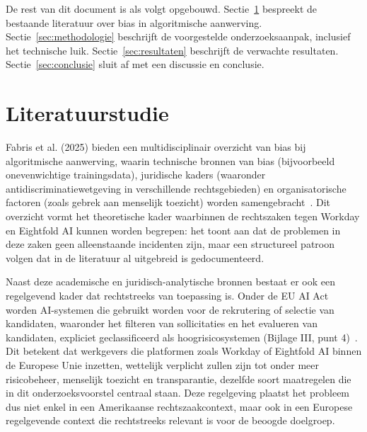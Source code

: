 \documentclass{hogent-article}
\begin{document}
De rest van dit document is als volgt opgebouwd. Sectie~\ref{sec:literatuurstudie}
bespreekt de bestaande literatuur over bias in algoritmische aanwerving.
Sectie~\ref{sec:methodologie} beschrijft de voorgestelde onderzoeksaanpak,
inclusief het technische luik. Sectie~\ref{sec:resultaten} beschrijft de
verwachte resultaten. Sectie~\ref{sec:conclusie} sluit af met een discussie
en conclusie.

\section{Literatuurstudie}%
\label{sec:literatuurstudie}

Fabris et al. (2025) bieden een multidisciplinair overzicht van bias bij
algoritmische aanwerving, waarin technische bronnen van bias (bijvoorbeeld
onevenwichtige trainingsdata), juridische kaders (waaronder
antidiscriminatiewetgeving in verschillende rechtsgebieden) en
organisatorische factoren (zoals gebrek aan menselijk toezicht) worden
samengebracht~\autocite{Fabris2025}. Dit overzicht vormt het theoretische
kader waarbinnen de rechtszaken tegen Workday en Eightfold AI kunnen worden
begrepen: het toont aan dat de problemen in deze zaken geen alleenstaande
incidenten zijn, maar een structureel patroon volgen dat in de literatuur al
uitgebreid is gedocumenteerd.

Naast deze academische en juridisch-analytische bronnen bestaat er ook een
regelgevend kader dat rechtstreeks van toepassing is. Onder de EU AI Act
worden AI-systemen die gebruikt worden voor de rekrutering of selectie van
kandidaten, waaronder het filteren van sollicitaties en het evalueren van
kandidaten, expliciet geclassificeerd als hoogrisicosystemen (Bijlage III,
punt 4)~\autocite{EUAIAct2024}. Dit betekent dat werkgevers die platformen
zoals Workday of Eightfold AI binnen de Europese Unie inzetten, wettelijk
verplicht zullen zijn tot onder meer risicobeheer, menselijk toezicht en
transparantie, dezelfde soort maatregelen die in dit onderzoeksvoorstel
centraal staan. Deze regelgeving plaatst het probleem dus niet enkel in een
Amerikaanse rechtszaakcontext, maar ook in een Europese regelgevende context
die rechtstreeks relevant is voor de beoogde doelgroep.
\end{document}
